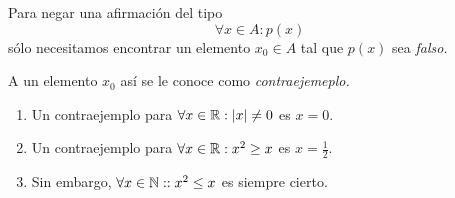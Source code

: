  \begin{observacion}
  Para negar una afirmación del tipo $$\forall x \in A: p(x)$$ sólo necesitamos encontrar un elemento $x_{0}\in A$ tal que $p(x)$ sea \emph{falso.}


  A un elemento $x_{0}$ así se le conoce como \emph{contraejemeplo.}
 \end{observacion}

 \begin{resuelto}
 \label{lip:4.11}
  \begin{enumerate}
   \item
  Un contraejemplo para $\forall x \in \mathbb{R}: \left|x\right|\neq 0$ es $x=0.$
   \item
  Un contraejemplo para $\forall x \in \mathbb{R}: x^{2}\geq x$ es $x=\frac{1}{2}.$
   \item
  Sin embargo, $\forall x \in \mathbb{N}: : x^{2}\leq x$ es siempre cierto.
  \end{enumerate}

 \end{resuelto}





